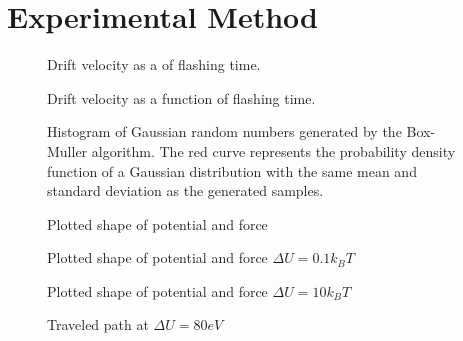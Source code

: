\section{Experimental Method}


\begin{figure}[H]
    \centering
    \resizebox{\columnwidth}{!}{}
    \caption{Drift velocity as a  of flashing time.}
    \label{fig:drift_velocity}
\end{figure}

\begin{figure}[H]
    \centering
    \resizebox{\columnwidth}{!}{}
    \caption{Drift velocity as a function of flashing time.}
    \label{fig:drift_velocitytest}
\end{figure}

\begin{figure}[H]
    \centering
    \resizebox{\columnwidth}{!}{}
    \caption{Histogram of Gaussian random numbers generated by the Box-Muller algorithm. The red curve represents the probability density function of a Gaussian distribution with the same mean and standard deviation as the generated samples.}
    \label{fig:gaussian}
\end{figure}

\begin{figure}[H]
    \centering
    \resizebox{\columnwidth}{!}{}
    \caption{Plotted shape of potential and force}
    \label{fig:potentia_force}
\end{figure}


\begin{figure}[H]
    \centering
    \resizebox{\columnwidth}{!}{}
    \caption{Plotted shape of potential and force $\Delta U = 0.1 k_B T$}
    \label{fig:No_flashing}
\end{figure}

\begin{figure}[H]
    \centering
    \resizebox{\columnwidth}{!}{}
    \caption{Plotted shape of potential and force $\Delta U = 10 k_B T$}
    \label{fig:No_flashing}
\end{figure}


\begin{figure}[H]
    \centering
    \resizebox{\columnwidth}{!}{}
    \caption{Traveled path at $\Delta U = 80 eV$}
    \label{fig:particle_path_flashing}
\end{figure}



